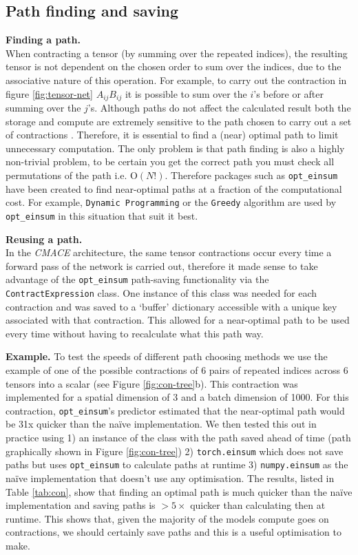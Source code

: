 \subsection{Path finding and saving} \label{sec:paths}

\textbf{Finding a path. }\\
When contracting a tensor (by summing over the repeated indices), the resulting tensor is not dependent on the chosen order to sum over the indices, due to the associative nature of this operation. For example, to carry out the contraction in figure \ref{fig:tensor-net} $A_{ij}B_{ij}$ it is possible to sum over the $i$'s before or after summing over the $j$'s. Although paths do not affect the calculated result both the storage and compute are extremely sensitive to the path chosen to carry out a set of contractions \cite{Markov_2008}. Therefore, it is essential to find a (near) optimal path to limit unnecessary computation. The only problem is that path finding is also a highly non-trivial problem, to be certain you get the correct path you must check all permutations of the path i.e. $\mathrm O (N!)$. Therefore packages such as \texttt{opt\_einsum} have been created to find near-optimal paths at a fraction of the computational cost. For example, \texttt{Dynamic Programming} or the \texttt{Greedy} algorithm are used by \texttt{opt\_einsum} in this situation that suit it best. 

\textbf{Reusing a path. }\\
In the \textit{CMACE} architecture, the same tensor contractions occur every time a forward pass of the network is carried out, therefore it made sense to take advantage of the \texttt{opt\_einsum} path-saving functionality via the \texttt{ContractExpression} class. One instance of this class was needed for each contraction and was saved to a `buffer' dictionary accessible with a unique key associated with that contraction. This allowed for a near-optimal path to be used every time without having to recalculate what this path way.

\textbf{Example. } To test the speeds of different path choosing methods we use the example of one of the possible contractions of 6 pairs of repeated indices across 6 tensors into a scalar (see Figure \ref{fig:con-tree}b). This contraction was implemented for a spatial dimension of 3 and a batch dimension of 1000. For this contraction, \texttt{opt\_einsum}'s predictor estimated that the near-optimal path would be 31x quicker than the na\"ive implementation. We then tested this out in practice using 1) an instance of the class with the path saved ahead of time (path graphically shown in Figure \ref{fig:con-tree}) 2) \texttt{torch.einsum} which does not save paths but uses \texttt{opt\_einsum} to calculate paths at runtime 3) \texttt{numpy.einsum} as the na\"ive implementation that doesn't use any optimisation. The results, listed in Table \ref{tab:con}, show that finding an optimal path is much quicker than the na\"ive implementation and saving paths is $>5\times$ quicker than calculating then at runtime. This shows that, given the majority of the models compute goes on contractions, we should certainly save paths and this is a useful optimisation to make. 


